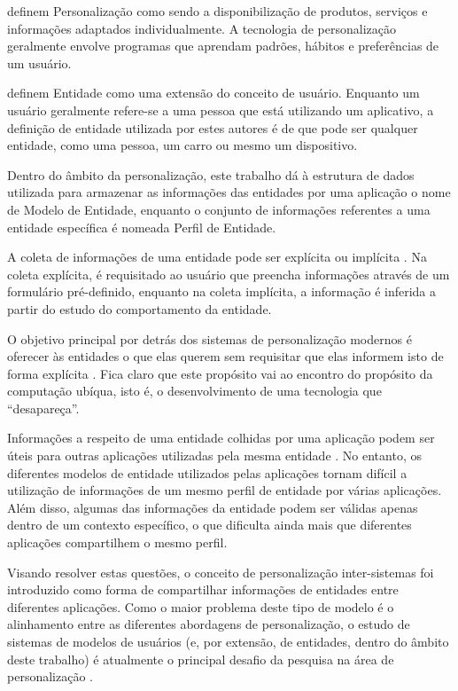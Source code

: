  definem Personalização como sendo a disponibilização de produtos, serviços e informações adaptados individualmente. A tecnologia de personalização geralmente envolve programas que aprendam padrões, hábitos e preferências de um usuário.

 definem Entidade como uma extensão do conceito de usuário. Enquanto um usuário geralmente refere-se a uma pessoa que está utilizando um aplicativo, a definição de entidade utilizada por estes autores é de que pode ser qualquer entidade, como uma pessoa, um carro ou mesmo um dispositivo.

Dentro do âmbito da personalização, este trabalho dá à estrutura de dados utilizada para armazenar as informações das entidades por uma aplicação o nome de Modelo de Entidade, enquanto o conjunto de informações referentes a uma entidade específica é nomeada Perfil de Entidade.

A coleta de informações de uma entidade pode ser explícita ou implícita \cite{viviani10}. Na coleta explícita, é requisitado ao usuário que preencha informações através de um formulário pré-definido, enquanto na coleta implícita, a informação é inferida a partir do estudo do comportamento da entidade.

O objetivo principal por detrás dos sistemas de personalização modernos é oferecer às entidades o que elas querem sem requisitar que elas informem isto de forma explícita \cite{mulvenna00}. Fica claro que este propósito vai ao encontro do propósito da computação ubíqua, isto é, o desenvolvimento de uma tecnologia que ``desapareça''.

Informações a respeito de uma entidade colhidas por uma aplicação podem ser úteis para outras aplicações utilizadas pela mesma entidade \cite{viviani10}. No entanto, os diferentes modelos de entidade utilizados pelas aplicações tornam difícil a utilização de informações de um mesmo perfil de entidade por várias aplicações. Além disso, algumas das informações da entidade podem ser válidas apenas dentro de um contexto específico, o que dificulta ainda mais que diferentes aplicações compartilhem o mesmo perfil.

Visando resolver estas questões, o conceito de personalização inter-sistemas foi introduzido \cite{niederee04} como forma de compartilhar informações de entidades entre diferentes aplicações. Como o maior problema deste tipo de modelo é o alinhamento entre as diferentes abordagens de personalização, o estudo de sistemas de modelos de usuários (e, por extensão, de entidades, dentro do âmbito deste trabalho) é atualmente o principal desafio da pesquisa na área de personalização \cite{viviani10}.

